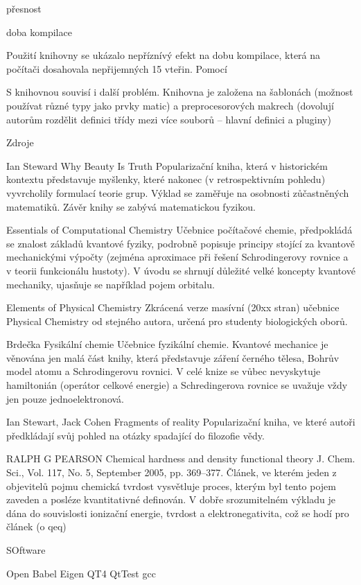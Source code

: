 \documentclass[
  color, %
  table, %
  lof,   %
  lot,   %
]{fithesis3}
\begin{document}
přesnost

doba kompilace

Použití knihovny se ukázalo nepříznívý efekt na dobu kompilace, která na počítači dosahovala nepřijemných 15 vteřin. Pomocí 

S knihovnou souvisí i další problém. Knihovna je založena na šablonách (možnost používat různé typy jako prvky matic) a preprocesorových makrech (dovolují autorům rozdělit definici třídy mezi více souborů -- hlavní definici a pluginy)


Zdroje

Ian Steward Why Beauty Is Truth
Popularizační kniha, která v historickém kontextu představuje myšlenky, které nakonec (v retrospektivním pohledu) vyvrcholily formulací teorie grup. Výklad se zaměřuje na osobnosti zůčastněných matematiků. Závěr knihy se zabývá matematickou fyzikou.

Essentials of Computational Chemistry
Učebnice počítačové chemie, předpokládá se znalost základů kvantové fyziky, podrobně popisuje principy stojící za kvantově mechanickými výpočty (zejména aproximace při řešení Schrodingerovy rovnice a v teorii funkcionálu hustoty). V úvodu se shrnují důležité velké koncepty  kvantové mechaniky, ujasňuje se například pojem orbitalu.

Elements of Physical Chemistry
Zkrácená verze masívní (20xx stran) učebnice Physical Chemistry od stejného autora, určená pro studenty biologických oborů.

Brdečka Fysikální chemie
Učebnice fyzikální chemie. Kvantové mechanice je věnována jen malá část knihy, která představuje záření černého tělesa, Bohrův model atomu a Schrodingerovu rovnici. V celé knize se vůbec nevyskytuje hamiltonián (operátor celkové energie) a Schredingerova rovnice se uvažuje vždy jen pouze jednoelektronová.

Ian Stewart, Jack Cohen Fragments of reality
Popularizační kniha, ve které autoři předkládají svůj pohled na otázky spadající do filozofie vědy.

RALPH G PEARSON Chemical hardness and density functional theory J. Chem. Sci., Vol. 117, No. 5, September 2005, pp. 369–377.
Článek, ve kterém jeden z objevitelů pojmu chemická tvrdost vysvětluje proces, kterým byl tento pojem zaveden a posléze kvantitativné definován. V dobře srozumitelném výkladu je dána do souvislosti ionizační energie, tvrdost a elektronegativita, což se hodí pro článek (o qeq)

SOftware

Open Babel
Eigen
QT4
QtTest
gcc
\end{document}
